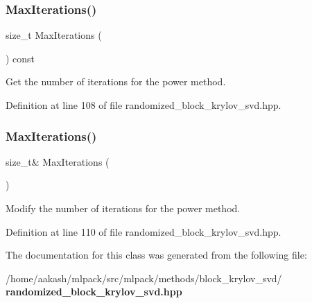 \subsubsection{Max\+Iterations()\hspace{0.1cm}{\footnotesize\ttfamily [1/2]}}
{\footnotesize\ttfamily size\+\_\+t Max\+Iterations (\begin{DoxyParamCaption}{ }\end{DoxyParamCaption}) const\hspace{0.3cm}{\ttfamily [inline]}}



Get the number of iterations for the power method. 



Definition at line 108 of file randomized\+\_\+block\+\_\+krylov\+\_\+svd.\+hpp.

\mbox{\label{classmlpack_1_1svd_1_1RandomizedBlockKrylovSVD_acda675ab4ab86b95c92bc33bc391a61b}} 
\subsubsection{Max\+Iterations()\hspace{0.1cm}{\footnotesize\ttfamily [2/2]}}
{\footnotesize\ttfamily size\+\_\+t\& Max\+Iterations (\begin{DoxyParamCaption}{ }\end{DoxyParamCaption})\hspace{0.3cm}{\ttfamily [inline]}}



Modify the number of iterations for the power method. 



Definition at line 110 of file randomized\+\_\+block\+\_\+krylov\+\_\+svd.\+hpp.



The documentation for this class was generated from the following file\+:\begin{DoxyCompactItemize}
\item 
/home/aakash/mlpack/src/mlpack/methods/block\+\_\+krylov\+\_\+svd/\textbf{ randomized\+\_\+block\+\_\+krylov\+\_\+svd.\+hpp}\end{DoxyCompactItemize}
